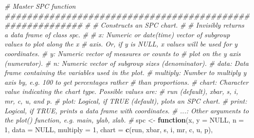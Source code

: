 \documentclass[
]{book}
\newenvironment{Shaded}{\begin{snugshade}}{\end{snugshade}}
\newcommand{\AttributeTok}[1]{\textcolor[rgb]{0.13,0.29,0.53}{#1}}
\newcommand{\CommentTok}[1]{\textcolor[rgb]{0.56,0.35,0.01}{\textit{#1}}}
\newcommand{\ConstantTok}[1]{\textcolor[rgb]{0.56,0.35,0.01}{#1}}
\newcommand{\ControlFlowTok}[1]{\textcolor[rgb]{0.13,0.29,0.53}{\textbf{#1}}}
\newcommand{\DecValTok}[1]{\textcolor[rgb]{0.00,0.00,0.81}{#1}}
\newcommand{\FunctionTok}[1]{\textcolor[rgb]{0.13,0.29,0.53}{\textbf{#1}}}
\newcommand{\NormalTok}[1]{#1}
\newcommand{\OtherTok}[1]{\textcolor[rgb]{0.56,0.35,0.01}{#1}}
\newcommand{\StringTok}[1]{\textcolor[rgb]{0.31,0.60,0.02}{#1}}
\begin{document}
\begin{Shaded}
\begin{Highlighting}[]
\CommentTok{\# Master SPC function \#\#\#\#\#\#\#\#\#\#\#\#\#\#\#\#\#\#\#\#\#\#\#\#\#\#\#\#\#\#\#\#\#\#\#\#\#\#\#\#\#\#\#\#\#\#\#\#\#\#\#\#\#\#\#\#\#\#}
\CommentTok{\# }
\CommentTok{\# Constructs an SPC chart.}
\CommentTok{\# }
\CommentTok{\#  Invisibly returns a data frame of class \textquotesingle{}spc\textquotesingle{}.}
\CommentTok{\# }
\CommentTok{\#  x:        Numeric or date(time) vector of subgroup values to plot along the x}
\CommentTok{\#            axis. Or, if y is NULL, x values will be used for y coordinates.}
\CommentTok{\#  y:        Numeric vector of measures or counts to}
\CommentTok{\#            plot on the y axis (numerator).}
\CommentTok{\#  n:        Numeric vector of subgroup sizes (denominator).}
\CommentTok{\#  data:     Data frame containing the variables used in the plot.}
\CommentTok{\#  multiply: Number to multiply y axis by, e.g. 100 to get percentages rather }
\CommentTok{\#            than proportions.}
\CommentTok{\#  chart:    Character value indicating the chart type. Possible values are:}
\CommentTok{\#            \textquotesingle{}run\textquotesingle{} (default), \textquotesingle{}xbar\textquotesingle{}, \textquotesingle{}s\textquotesingle{}, \textquotesingle{}i\textquotesingle{}, \textquotesingle{}mr\textquotesingle{}, \textquotesingle{}c\textquotesingle{}, \textquotesingle{}u\textquotesingle{}, and \textquotesingle{}p\textquotesingle{}.}
\CommentTok{\#  plot:     Logical, if TRUE (default), plots an SPC chart.}
\CommentTok{\#  print:    Logical, if TRUE, prints a data frame with coordinates.}
\CommentTok{\#  ...:      Other arguments to the plot() function, e.g. main, ylab, xlab.}
\CommentTok{\# }
\NormalTok{spc }\OtherTok{\textless{}{-}} \ControlFlowTok{function}\NormalTok{(x,}
                \AttributeTok{y        =} \ConstantTok{NULL}\NormalTok{,}
                \AttributeTok{n        =} \DecValTok{1}\NormalTok{,}
                \AttributeTok{data     =} \ConstantTok{NULL}\NormalTok{,}
                \AttributeTok{multiply =} \DecValTok{1}\NormalTok{,}
                \AttributeTok{chart    =} \FunctionTok{c}\NormalTok{(}\StringTok{\textquotesingle{}run\textquotesingle{}}\NormalTok{, }\StringTok{\textquotesingle{}xbar\textquotesingle{}}\NormalTok{, }\StringTok{\textquotesingle{}s\textquotesingle{}}\NormalTok{, }\StringTok{\textquotesingle{}i\textquotesingle{}}\NormalTok{, }\StringTok{\textquotesingle{}mr\textquotesingle{}}\NormalTok{, }\StringTok{\textquotesingle{}c\textquotesingle{}}\NormalTok{, }\StringTok{\textquotesingle{}u\textquotesingle{}}\NormalTok{, }\StringTok{\textquotesingle{}p\textquotesingle{}}\NormalTok{),}

\end{Highlighting}
\end{Shaded}
\end{document}
